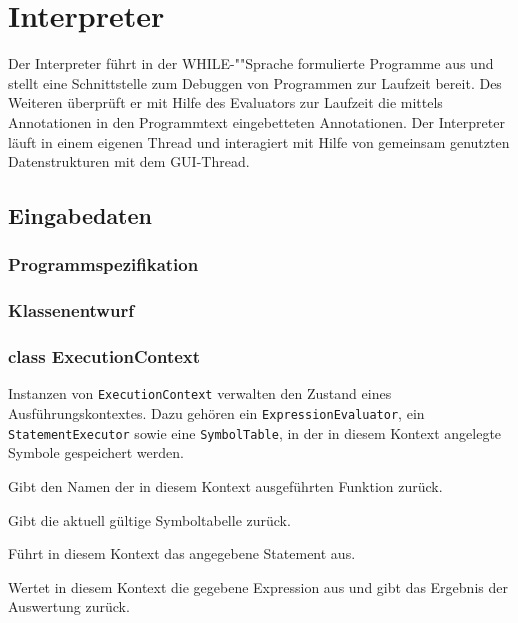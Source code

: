 \section{Interpreter}

Der Interpreter führt in der WHILE-""Sprache formulierte Programme aus und stellt eine Schnittstelle zum Debuggen von Programmen zur Laufzeit bereit. Des Weiteren überprüft er mit Hilfe des Evaluators zur Laufzeit die mittels Annotationen in den Programmtext eingebetteten Annotationen. Der Interpreter läuft in einem eigenen Thread und interagiert mit Hilfe von gemeinsam genutzten Datenstrukturen mit dem GUI-Thread.

\subsection{Eingabedaten}

\subsubsection{Programmspezifikation}


\subsubsection{Klassenentwurf}

\subsubsection{class ExecutionContext}
Instanzen von \texttt{ExecutionContext} verwalten den Zustand eines Ausführungskontextes. Dazu gehören ein \texttt{ExpressionEvaluator}, ein \texttt{StatementExecutor} sowie eine \texttt{SymbolTable}, in der in diesem Kontext angelegte Symbole gespeichert werden.


\begin{description}
    Gibt den Namen der in diesem Kontext ausgeführten Funktion zurück.

    Gibt die aktuell gültige Symboltabelle zurück.

    Führt in diesem Kontext das angegebene Statement aus.

    Wertet in diesem Kontext die gegebene Expression aus und gibt das Ergebnis der Auswertung zurück.
\end{description}


